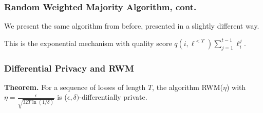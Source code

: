 \documentclass[aspectratio=169]{beamer}
\begin{document}
\begin{frame}
\frametitle{Random Weighted Majority Algorithm, cont.}

We present the same algorithm from before, presented in a slightly different way.

\begin{algorithm}[H]
\begin{algorithmic}
  \EndFor
  \EndProcedure
\end{algorithmic}
\end{algorithm}

This is the exponential mechanism with quality score $q(i, \ell^{< T}) \sum_{j=1}^{t-1} \ell_i^j$.
\end{frame}

\begin{frame}
\frametitle{Differential Privacy and RWM}

\textbf{Theorem.} For a sequence of losses of length $T$, the algorithm RWM($\eta$) with $\eta = \frac{\epsilon}{\sqrt{32 T \ln(1/\delta)}}$ is ($\epsilon, \delta)$-differentially private.
\end{frame}
\end{document}
